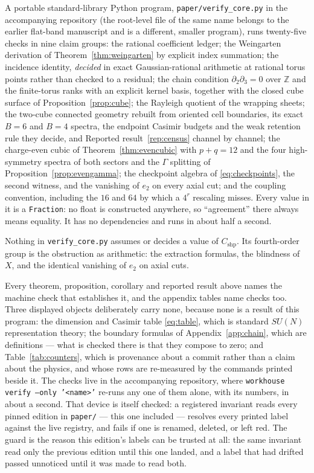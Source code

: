 \documentclass[10pt,twocolumn]{article}
\theoremstyle{plain}
\theoremstyle{definition}
\theoremstyle{remark}
\begin{document}
A portable standard-library Python program, \texttt{paper/verify\_core.py} in
the accompanying repository (the root-level file of the same name belongs to
the earlier flat-band manuscript and is a different, smaller program), runs
twenty-five checks in nine claim groups: the rational coefficient ledger; the
Weingarten derivation of Theorem~\ref{thm:weingarten} by explicit index
summation; the incidence identity, \emph{decided} in exact Gaussian-rational
arithmetic at rational torus points rather than checked to a residual; the
chain condition $\partial_2\partial_3=0$ over $\mathbb Z$ and the finite-torus
ranks with an explicit kernel basis, together with the closed cube surface of
Proposition~\ref{prop:cube}; the Rayleigh quotient of the wrapping sheets; the
two-cube connected geometry rebuilt from oriented cell boundaries, its exact
$B=6$ and $B=4$ spectra, the endpoint Casimir budgets and the weak retention
rule they decide, and Reported result~\ref{rep:census} channel by channel; the charge-even cubic of Theorem~\ref{thm:evencubic} with $p+q=12$ and
the four high-symmetry spectra of both sectors and the $\Gamma$ splitting of
Proposition~\ref{prop:evengamma}; the checkpoint algebra of
\eqref{eq:checkpoints}, the second witness, and the vanishing of $e_2$ on
every axial cut;
and the coupling convention, including the $16$ and $64$ by which a $4^r$
rescaling misses. Every value in it is a
\texttt{Fraction}: no float is constructed anywhere, so ``agreement'' there
always means equality. It has no dependencies and runs in about half a second.

Nothing in \texttt{verify\_core.py} assumes or decides a value of
$C_{\mathrm{shp}}$. Its fourth-order group is the obstruction as arithmetic:
the extraction formulas, the blindness of $X$, and the identical vanishing of
$e_2$ on axial cuts.

Every theorem, proposition, corollary and reported result above names the
machine check that establishes it, and the appendix tables name checks too.
Three displayed objects deliberately carry none, because none is a result of
this program: the dimension and Casimir table \eqref{eq:table}, which is
standard $SU(N)$ representation theory; the boundary formulas of
Appendix~\ref{app:chain}, which are definitions --- what is checked there is
that they compose to zero; and Table~\ref{tab:counters}, which is provenance
about a commit rather than a claim about the physics, and whose rows are
re-measured by the commands printed beside it. The checks live in the
accompanying repository, where
\texttt{workhouse verify --only '<name>'} re-runs any one of them alone, with
its numbers, in about a second. That device is itself checked: a registered
invariant reads every pinned edition in \texttt{paper/} --- this one included
--- resolves every printed label against the live registry, and fails if one is
renamed, deleted, or left red. The guard is the reason this edition's labels
can be trusted at all: the same invariant read only the previous edition until
this one landed, and a label that had drifted passed unnoticed until it was
made to read both.
\end{document}
